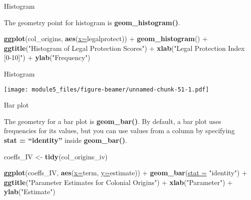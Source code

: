 \documentclass[ignorenonframetext,]{beamer}
\newenvironment{Shaded}{\begin{snugshade}}{\end{snugshade}}
\newcommand{\KeywordTok}[1]{\textcolor[rgb]{0.26,0.66,0.93}{\textbf{#1}}}
\newcommand{\DataTypeTok}[1]{\textcolor[rgb]{0.74,0.68,0.62}{\underline{#1}}}
\newcommand{\StringTok}[1]{\textcolor[rgb]{0.02,0.61,0.04}{#1}}
\newcommand{\OperatorTok}[1]{\textcolor[rgb]{0.74,0.68,0.62}{#1}}
\newcommand{\NormalTok}[1]{\textcolor[rgb]{0.74,0.68,0.62}{#1}}
\begin{document}
\begin{frame}[fragile]{Histogram}

The geometry point for histogram is \textbf{geom\_histogram()}.

\begin{Shaded}
\begin{Highlighting}[]
\KeywordTok{ggplot}\NormalTok{(col_origins, }\KeywordTok{aes}\NormalTok{(}\DataTypeTok{x=}\NormalTok{legalprotect)) }\OperatorTok{+}\StringTok{ }
\StringTok{  }\KeywordTok{geom_histogram}\NormalTok{() }\OperatorTok{+}\StringTok{ }
\StringTok{  }\KeywordTok{ggtitle}\NormalTok{(}\StringTok{"Histogram of Legal Protection Scores"}\NormalTok{) }\OperatorTok{+}
\StringTok{  }\KeywordTok{xlab}\NormalTok{(}\StringTok{"Legal Protection Index [0-10]"}\NormalTok{) }\OperatorTok{+}
\StringTok{  }\KeywordTok{ylab}\NormalTok{(}\StringTok{"Frequency"}\NormalTok{) }
\end{Highlighting}
\end{Shaded}

\end{frame}

\begin{frame}{Histogram}

\texttt{[image: module5\_files/figure-beamer/unnamed-chunk-51-1.pdf]}

\end{frame}

\begin{frame}[fragile]{Bar plot}

The geometry for a bar plot is \textbf{geom\_bar()}. By default, a bar
plot uses frequencies for its values, but you can use values from a
column by specifying \textbf{stat = ``identity''} inside
\textbf{geom\_bar()}.

\begin{Shaded}
\begin{Highlighting}[]
\NormalTok{coeffs_IV <-}\StringTok{ }\KeywordTok{tidy}\NormalTok{(col_origins_iv)}

\KeywordTok{ggplot}\NormalTok{(coeffs_IV, }
  \KeywordTok{aes}\NormalTok{(}\DataTypeTok{x=}\NormalTok{term, }\DataTypeTok{y=}\NormalTok{estimate)) }\OperatorTok{+}\StringTok{ }
\StringTok{  }\KeywordTok{geom_bar}\NormalTok{(}\DataTypeTok{stat =} \StringTok{"identity"}\NormalTok{) }\OperatorTok{+}\StringTok{ }
\StringTok{  }\KeywordTok{ggtitle}\NormalTok{(}\StringTok{"Parameter Estimates for Colonial Origins"}\NormalTok{) }\OperatorTok{+}
\StringTok{  }\KeywordTok{xlab}\NormalTok{(}\StringTok{"Parameter"}\NormalTok{) }\OperatorTok{+}\StringTok{ }\KeywordTok{ylab}\NormalTok{(}\StringTok{"Estimate"}\NormalTok{)}
\end{Highlighting}
\end{Shaded}

\end{frame}
\end{document}
